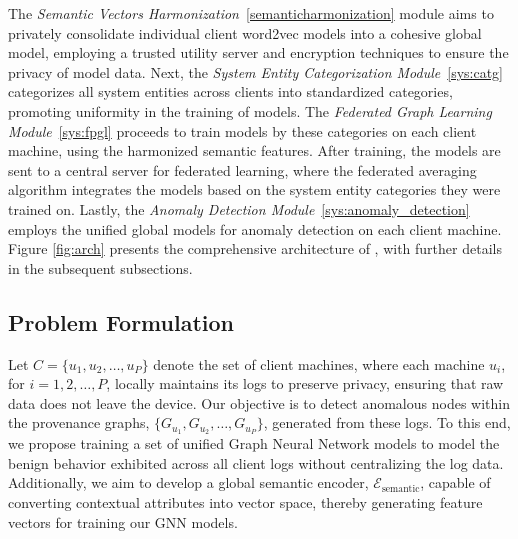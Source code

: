 The \textit{Semantic Vectors Harmonization}~\ref{semanticharmonization} module aims to privately consolidate individual client word2vec models into a cohesive global model, employing a trusted utility server and encryption techniques to ensure the privacy of model data. Next, the \textit{System Entity Categorization Module}~\ref{sys:catg} categorizes all system entities across clients into standardized categories, promoting uniformity in the training of \gnnshort models. The \textit{Federated Graph Learning Module}~\ref{sys:fpgl} proceeds to train \gnnshort models by these categories on each client machine, using the harmonized semantic features. After training, the models are sent to a central server for federated learning, where the federated averaging algorithm integrates the models based on the system entity categories they were trained on. Lastly, the \textit{Anomaly Detection Module}~\ref{sys:anomaly_detection} employs the unified global models for anomaly detection on each client machine. Figure \ref{fig:arch} presents the comprehensive architecture of \Sys, with further details in the subsequent subsections.

\subsection{Problem Formulation}

Let \( C = \{u_1, u_2, \ldots, u_P\} \) denote the set of client machines, where each machine \( u_i \), for \( i = 1, 2, \ldots, P \), locally maintains its \logs logs to preserve privacy, ensuring that raw data does not leave the device. Our objective is to detect anomalous nodes within the provenance graphs, \( \{G_{u_1}, G_{u_2}, \ldots, G_{u_P}\} \), generated from these logs. To this end, we propose training a set of unified Graph Neural Network models to model the benign behavior exhibited across all client logs without centralizing the log data. Additionally, we aim to develop a global semantic encoder, \( \mathcal{E}_{\text{semantic}} \), capable of converting contextual attributes into vector space, thereby generating feature vectors for training our GNN models.


